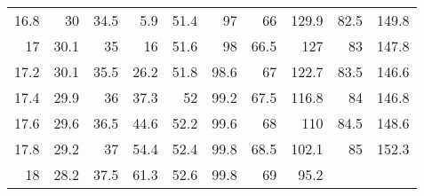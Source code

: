 \documentclass[a4 paper,12pt]{article}
\begin{document}
\begin{footnotesize}
\begin{longtable}{||r|r||r|r||r|r||r|r||r|r||}
		16.8  & 30    & 34.5  & 5.9   & 51.4  & 97    & 66    & 129.9 & 82.5  & 149.8 \\
		17    & 30.1  & 35    & 16    & 51.6  & 98    & 66.5  & 127   & 83    & 147.8 \\
		17.2  & 30.1  & 35.5  & 26.2  & 51.8  & 98.6  & 67    & 122.7 & 83.5  & 146.6 \\
		17.4  & 29.9  & 36    & 37.3  & 52    & 99.2  & 67.5  & 116.8 & 84    & 146.8 \\
		17.6  & 29.6  & 36.5  & 44.6  & 52.2  & 99.6  & 68    & 110   & 84.5  & 148.6 \\
		17.8  & 29.2  & 37    & 54.4  & 52.4  & 99.8  & 68.5  & 102.1 & 85    & 152.3 \\
		18    & 28.2  & 37.5  & 61.3  & 52.6  & 99.8  & 69    & 95.2  &       &  \\
		\hline
	\end{longtable}
\end{footnotesize}
\end{document}
